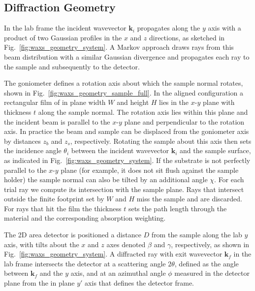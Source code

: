\subsection{Diffraction Geometry}

In the lab frame the incident wavevector $\mathbf{k}_i$ propagates along the $y$ axis with a product of two Gaussian profiles in the $x$ and $z$ directions, as sketched in Fig.~\ref{fig:waxs_geometry_system}. A Markov approach draws rays from this beam distribution with a similar Gaussian divergence and propagates each ray to the sample and subsequently to the detector.

The goniometer defines a rotation axis about which the sample normal rotates, shown in Fig.~\ref{fig:waxs_geometry_sample_full}. In the aligned configuration a rectangular film of in plane width $W$ and height $H$ lies in the $x$-$y$ plane with thickness $t$ along the sample normal. The rotation axis lies within this plane and the incident beam is parallel to the $x$-$y$ plane and perpendicular to the rotation axis. In practice the beam and sample can be displaced from the goniometer axis by distances $z_b$ and $z_s$, respectively. Rotating the sample about this axis then sets the incidence angle $\theta_i$ between the incident wavevector $\mathbf{k}_i$ and the sample surface, as indicated in Fig.~\ref{fig:waxs_geometry_system}. If the substrate is not perfectly parallel to the $x$-$y$ plane (for example, it does not sit flush against the sample holder) the sample normal can also be tilted by an additional angle $\chi$. For each trial ray we compute its intersection with the sample plane. Rays that intersect outside the finite footprint set by $W$ and $H$ miss the sample and are discarded. For rays that hit the film the thickness $t$ sets the path length through the material and the corresponding absorption weighting.

The 2D area detector is positioned a distance $D$ from the sample along the lab $y$ axis, with tilts about the $x$ and $z$ axes denoted $\beta$ and $\gamma$, respectively, as shown in Fig.~\ref{fig:waxs_geometry_system}. A diffracted ray with exit wavevector $\mathbf{k}_f$ in the lab frame intersects the detector at a scattering angle $2\theta$, defined as the angle between $\mathbf{k}_f$ and the $y$ axis, and at an azimuthal angle $\phi$ measured in the detector plane from the in plane $y'$ axis that defines the detector frame.
\ifshowGeometryFigures

